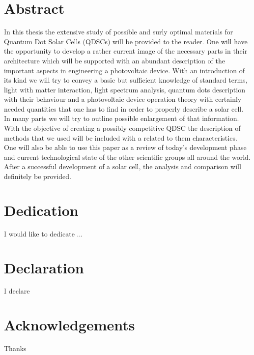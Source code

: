 \documentclass[12pt,twoside]{report}
\numberwithin{equation}{subsection}
\begin{document}
\graphicspath{ {images/} }


\chapter*{Abstract}
In this thesis the extensive study of possible and surly optimal materials for Quantum Dot Solar Cells (QDSCs) will be provided to the reader. One will have the opportunity to develop a rather current image of the necessary parts in their architecture which will be supported with an abundant description of the important aspects in engineering a photovoltaic device. With an introduction of its kind we will try to convey a basic but sufficient knowledge of standard terms, light with matter interaction, light spectrum analysis, quantum dots description with their behaviour and a photovoltaic device operation theory with certainly needed quantities that one has to find in order to properly describe a solar cell. In many parts we will try to outline possible enlargement of that information. With the objective of creating a possibly competitive QDSC the description of methods that we used will be included with a related to them characteristics. One will also be able to use this paper as a review of today’s development phase and current technological state of the other scientific groups all around the world.  After a successful development of a solar cell, the analysis and comparison will definitely be provided.
 
\chapter*{Dedication}
I would like to dedicate ...

\chapter*{Declaration}
I declare

\chapter*{Acknowledgements}
Thanks 

\tableofcontents
\listoffigures 
\listoftables















\printbibliography
\end{document}
